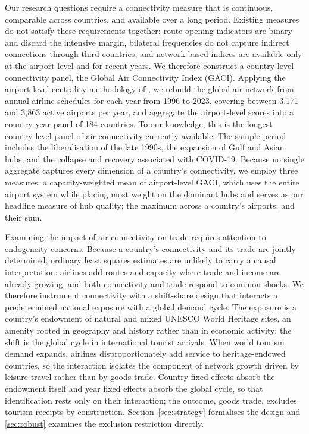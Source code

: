Our research questions require a connectivity measure that is continuous, comparable across countries, and available over a long period. Existing measures do not satisfy these requirements together: route-opening
indicators are binary and discard the intensive margin, bilateral frequencies do not capture indirect connections through third countries, and network-based indices are available only at the airport level and for
recent years. We therefore construct a country-level connectivity panel, the Global Air Connectivity Index (GACI). Applying the airport-level centrality methodology of \citet{Cheung_2020}, we rebuild the global air
network from annual airline schedules for each year from 1996 to 2023, covering between 3{,}171 and 3{,}863 active airports per year, and aggregate the airport-level scores into a country-year panel of 184
countries. To our knowledge, this is the longest country-level panel of air connectivity currently available. The sample period includes the liberalisation of the late 1990s, the expansion of Gulf and Asian hubs,
and the collapse and recovery associated with COVID-19. Because no single aggregate captures every dimension of a country's connectivity, we employ three measures: a capacity-weighted mean of airport-level GACI, which uses the entire airport system while placing most weight on the dominant hubs and serves as our headline measure of hub quality; the maximum across a country's airports; and their sum.

Examining the impact of air connectivity on trade requires attention to endogeneity concerns. Because a country's connectivity and its trade are jointly determined, ordinary least squares estimates are unlikely to carry a causal interpretation: airlines add routes and capacity where trade and income are already growing, and both connectivity and trade respond to common shocks. We therefore instrument connectivity with a shift-share design that interacts a predetermined national exposure with a global demand cycle. The exposure is a country's endowment of natural and mixed UNESCO World Heritage sites, an amenity rooted in geography and history rather than in economic activity; the shift is the global cycle in international tourist arrivals. When world tourism demand expands, airlines disproportionately add service to heritage-endowed countries, so the interaction isolates the component of network growth driven by leisure travel rather than by goods trade. Country fixed effects absorb the endowment itself and year fixed effects absorb the global cycle, so that identification rests only on their interaction; the outcome, goods trade, excludes tourism receipts by construction. Section~\ref{sec:strategy} formalises the design and \ref{sec:robust} examines the exclusion restriction directly.

